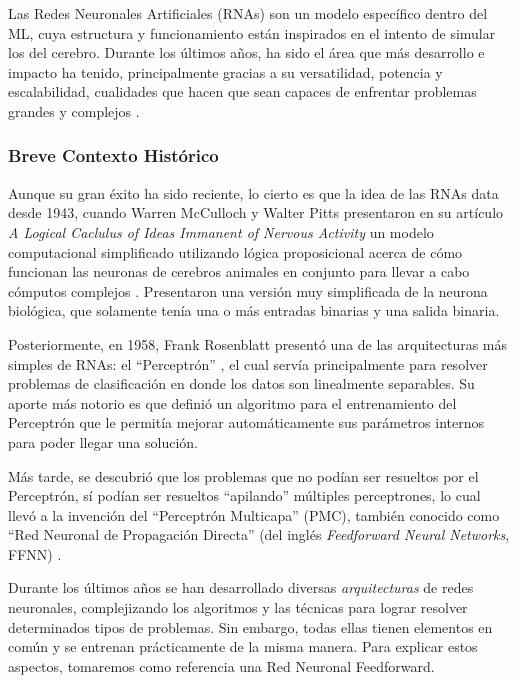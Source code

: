 \documentclass[../../main.tex]{subfiles}
\begin{document}
Las Redes Neuronales Artificiales (RNAs) son un modelo específico dentro del ML, cuya estructura y funcionamiento están inspirados en el intento de simular los del cerebro. Durante los últimos años, ha sido el área que más desarrollo e impacto ha tenido, principalmente gracias a su versatilidad, potencia y escalabilidad, cualidades que hacen que sean capaces de enfrentar problemas grandes y complejos \cite{hands-on-ML-sklearn-tf}.

\subsubsection{Breve Contexto Histórico}
Aunque su gran éxito ha sido reciente, lo cierto es que la idea de las RNAs data desde 1943, cuando Warren McCulloch y Walter Pitts presentaron en su artículo \textit{A Logical Caclulus of Ideas Immanent of Nervous Activity} \cite{mculloch-pitts-1943} un modelo computacional simplificado utilizando lógica proposicional acerca de cómo funcionan las neuronas de cerebros animales en conjunto para llevar a cabo cómputos complejos \cite{hands-on-ML-sklearn-tf}. Presentaron una versión muy simplificada de la neurona biológica, que solamente tenía una o más entradas binarias y una salida binaria.

Posteriormente, en 1958, Frank Rosenblatt presentó una de las arquitecturas más simples de RNAs: el ``Perceptrón'' \cite{rosenblatt1958perceptron}, el cual servía principalmente para resolver problemas de clasificación en donde los datos son linealmente separables. Su aporte más notorio es que definió un algoritmo para el entrenamiento del Perceptrón que le permitía mejorar automáticamente sus parámetros internos para poder llegar una solución.

Más tarde, se descubrió que los problemas que no podían ser resueltos por el Perceptrón, sí podían ser resueltos ``apilando'' múltiples perceptrones, lo cual llevó a la invención del ``Perceptrón Multicapa'' (PMC), también conocido como ``Red Neuronal de Propagación Directa'' (del inglés \textit{Feedforward Neural Networks}, FFNN) \cite{deep-learning}. 

Durante los últimos años se han desarrollado diversas \textit{arquitecturas} de redes neuronales, complejizando los algoritmos y las técnicas para lograr resolver determinados tipos de problemas. Sin embargo, todas ellas tienen elementos en común y se entrenan prácticamente de la misma manera. Para explicar estos aspectos, tomaremos como referencia una Red Neuronal Feedforward.
\end{document}

